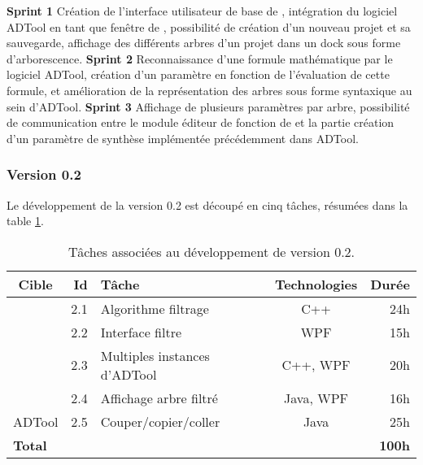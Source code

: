             \noindent\textbf{Sprint 1} Création de l'interface utilisateur de base de \glasir{}, intégration du logiciel ADTool en tant que fenêtre de \glasir{}, possibilité de création d'un nouveau projet et sa sauvegarde, affichage des différents arbres d'un projet dans un dock sous forme d'arborescence.\newline
            \textbf{Sprint 2} Reconnaissance d'une formule mathématique par le logiciel ADTool, création d'un paramètre en fonction de l'évaluation de cette formule, et amélioration de la représentation des arbres sous forme syntaxique au sein d'ADTool.\newline
            \textbf{Sprint 3} Affichage de plusieurs paramètres par arbre, possibilité de communication entre le module éditeur de fonction de \glasir{} et la partie création d'un paramètre de synthèse implémentée précédemment dans ADTool.\newline


        \subsubsection{Version 0.2}
            Le développement de la version 0.2 est découpé en cinq tâches, résumées dans la {\sc table} \ref{tab:taches_units_2}.
            \begin{table}[h]
                \centering
                \begin{tabular}{|c|r|l|c|r|}
                    \hline
                    \textbf{Cible} & \textbf{Id} & \textbf{Tâche} & \textbf{Technologies} & \textbf{Durée}\\
                    \hline

                    \multirow{4}{*}{\glasir{}} & 2.1 & Algorithme filtrage & C++ & 24h\\
                    \cline{2-5}
                     & 2.2 & Interface filtre & WPF & 15h\\
                    \cline{2-5}
                     & 2.3 & Multiples instances d'ADTool & C++, WPF & 20h\\
                    \cline{2-5}
                     & 2.4 & Affichage arbre filtré & Java, WPF & 16h\\
                    \hline

                    \multirow{1}{*}{ADTool} & 2.5 & Couper/copier/coller & \multirow{1}{*}{Java} & 25h\\
                    \hline

                    \multicolumn{4}{|l|}{\bf Total} & {\bf 100h}\\
                    \hline
                \end{tabular}
                \caption{Tâches associées au développement de \glasir{} version 0.2.}
                \label{tab:taches_units_2}
            \end{table}
            
